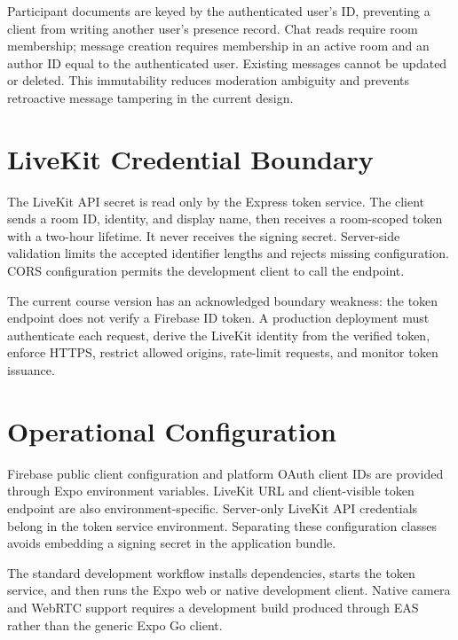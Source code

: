 Participant documents are keyed by the authenticated user's ID, preventing a client from writing another user's presence record. Chat reads require room membership; message creation requires membership in an active room and an author ID equal to the authenticated user. Existing messages cannot be updated or deleted. This immutability reduces moderation ambiguity and prevents retroactive message tampering in the current design.

\section{LiveKit Credential Boundary}
The LiveKit API secret is read only by the Express token service. The client sends a room ID, identity, and display name, then receives a room-scoped token with a two-hour lifetime. It never receives the signing secret. Server-side validation limits the accepted identifier lengths and rejects missing configuration. CORS configuration permits the development client to call the endpoint.

The current course version has an acknowledged boundary weakness: the token endpoint does not verify a Firebase ID token. A production deployment must authenticate each request, derive the LiveKit identity from the verified token, enforce HTTPS, restrict allowed origins, rate-limit requests, and monitor token issuance.

\section{Operational Configuration}
Firebase public client configuration and platform OAuth client IDs are provided through Expo environment variables. LiveKit URL and client-visible token endpoint are also environment-specific. Server-only LiveKit API credentials belong in the token service environment. Separating these configuration classes avoids embedding a signing secret in the application bundle.

The standard development workflow installs dependencies, starts the token service, and then runs the Expo web or native development client. Native camera and WebRTC support requires a development build produced through EAS rather than the generic Expo Go client.
